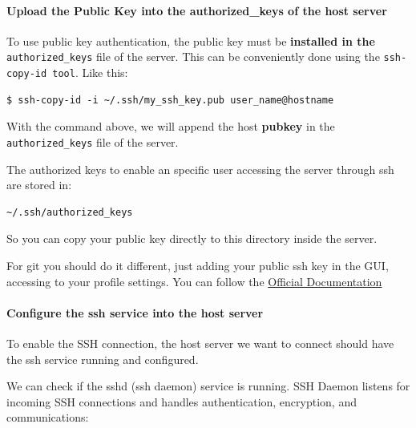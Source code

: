 \documentclass{article}
\newenvironment{blocktemplateII}[1]{%
    \tcolorbox[beamer,%
    noparskip,breakable,
    colframe=Green,%
    colbacklower=LimeGreen!75!LightGreen,%
    title=#1]}%
    {\endtcolorbox}
\newenvironment{blocktemplateIII}[1]{%
    \tcolorbox[beamer,%
    noparskip,breakable,
    ,colframe=Red,%
    colbacklower=LimeGreen!75!LightGreen,%
    title=#1]}%
    {\endtcolorbox}
\newenvironment{codetemplate}[1][]{%
  \mybasecolorbox[#1]
  \itshape
}{%
  \endmybasecolorbox
}
\begin{document}
\paragraph{Upload the Public Key into the authorized\_keys of the host server}
To use public key authentication, the public key must be \textbf{installed in the} \verb|authorized_keys| file of the server. This can be conveniently done using the \verb|ssh-copy-id tool|. Like this:

\begin{codetemplate}{}
\begin{verbatim}
$ ssh-copy-id -i ~/.ssh/my_ssh_key.pub user_name@hostname
\end{verbatim}
\end{codetemplate}

\begin{blocktemplateIII}{WARNING}
With the command above, we will append the host \textbf{pubkey} in the \verb|authorized_keys| file of the server.
\end{blocktemplateIII}

The authorized keys to enable an specific user accessing the server through ssh are stored in:

\begin{codetemplate}{}
\begin{verbatim}
~/.ssh/authorized_keys
\end{verbatim}
\end{codetemplate}
    
So you can copy your public key directly to this directory inside the server.

\begin{blocktemplateII}{Note}
For git you should do it different, just adding your public ssh key in the GUI, accessing to your profile settings. You can follow the \href{https://docs.github.com/en/authentication/connecting-to-github-with-ssh/adding-a-new-ssh-key-to-your-github-account}{Official Documentation}
\end{blocktemplateII}

\paragraph{Configure the ssh service into the host server}

To enable the SSH connection, the host server we want to connect should have the ssh service running and configured. 

We can check if the sshd (ssh daemon) service is running. SSH Daemon listens for incoming SSH connections and handles authentication, encryption, and communications: 
\end{document}
